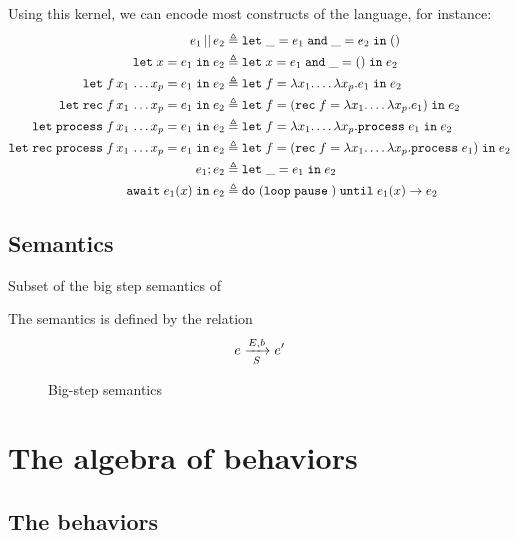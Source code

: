 \documentclass[9pt,preprint]{sigplanconf}
\newcommand{\deq}{\triangleq}
\begin{document}
Using this kernel, we can encode most constructs of the language, for instance:
%
\begin{align*}
\epar{e_1}{e_2} \deq &\; \eletpar{\_}{e_1}{\_}{e_2}{\evoid{}} \\
\elet{x}{e_1}{e_2} \deq &\; \eletpar{x}{e_1}{\_}{\evoid{}}{e_2} \\
\mathidl{let} f\, x_1\, \ldots x_p = e_1 \mathid{in} e_2
      \deq &\; \elet{f}{\elam{x_1}{\ldots \elam{x_p}{e_1}}}{e_2} \\
\mathidl{let} \mathidl{rec} f\, x_1\, \ldots x_p = e_1 \mathid{in} e_2
      \deq &\; \elet{f}{ (\erec{f}{\elam{x_1}{\ldots \elam{x_p}{e_1}}}) }{e_2} \\
\mathidl{let} \mathidl{process} f\, x_1\, \ldots x_p = e_1 \mathid{in} e_2
      \deq &\; \elet{f}{\elam{x_1}{\ldots \elam{x_p}{ \eproc{e_1} }}}{e_2} \\     
\mathidl{let} \mathidl{rec} \mathidl{process} f\, x_1\, \ldots x_p = e_1 \mathid{in} e_2
            \deq &\; \elet{f}{ (\erec{f}{\elam{x_1}{\ldots \elam{x_p}{\eproc{e_1}}}}) }{e_2} \\
\eseq{e_1}{e_2} \deq &\; \elet{\_}{e_1}{e_2}  \\
\eawait{e_1}{x}{e_2} \deq&\; \euntil{ (\eloop{\epause{}}) }{e_1}{x}{e_2}
\end{align*}


\subsection{Semantics}

Subset of the big step semantics of \rml{}

The semantics is defined by the relation
\[  \bigstep{N}{e}{e'}{E}{b}{S} \]

\begin{figure*}
\begin{small}

\end{small}


\caption{Big-step semantics}
\label{fig:big_step}
\end{figure*}

\section{The algebra of behaviors}

\subsection{The behaviors}
\end{document}
